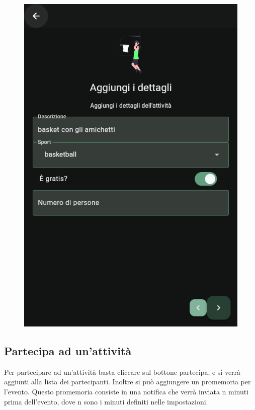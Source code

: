\documentclass[a4paper,12pt]{article}
\begin{document}
\begin{figure}[H]
\begin{minipage}{0.32\textwidth}
        \includegraphics[width=1\linewidth]{img/new_desc.png}
    \end{minipage}
\end{figure}

\subsection{Partecipa ad un'attività}

Per partecipare ad un'attività basta cliccare sul bottone partecipa, e si verrà aggiunti alla lista dei partecipanti. Inoltre si può aggiungere un promemoria per l'evento.
Questo promemoria consiste in una notifica che verrà inviata \textsf{n} minuti prima dell'evento, dove \textsf{n} sono i minuti definiti nelle impostazioni.
\end{document}
